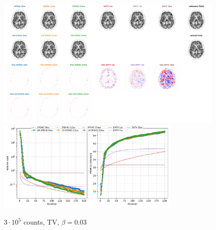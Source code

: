 \begin{figure}
  \centering
    \includegraphics[width=1.0\textwidth]{./figs/brain2d_counts_3.0E+05_seed_1_beta_3.0E-02_prior_TV_niter_ref_20000_fwhm_4.5_4.5_niter_200.png}
    \includegraphics[width=0.8\textwidth]{./figs/brain2d_counts_3.0E+05_seed_1_beta_3.0E-02_prior_TV_niter_ref_20000_fwhm_4.5_4.5_niter_200_metrics.pdf}
  \caption{$3\cdot10^5$ counts, TV, $\beta = 0.03$}
  \label{fig:metrics}
\end{figure}

